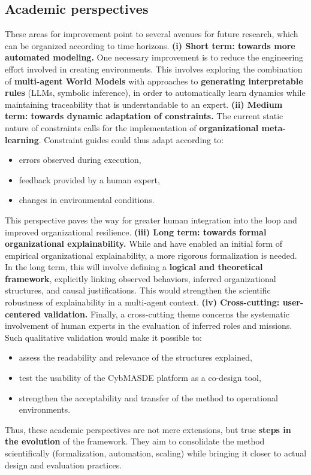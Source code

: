 \subsection*{Academic perspectives}
These areas for improvement point to several avenues for future research, which can be organized according to time horizons.
\medskip
\noindent
\textbf{(i) Short term: towards more automated modeling.}
One necessary improvement is to reduce the engineering effort involved in creating environments.
This involves exploring the combination of \textbf{multi-agent World Models} with approaches to \textbf{generating interpretable rules} (LLMs, symbolic inference), in order to automatically learn dynamics while maintaining traceability that is understandable to an expert.
\medskip
\noindent
\textbf{(ii) Medium term: towards dynamic adaptation of constraints.}
The current static nature of constraints calls for the implementation of \textbf{organizational meta-learning}.
Constraint guides could thus adapt according to:
\begin {itemize}
\item errors observed during execution,
\item feedback provided by a human expert,
\item changes in environmental conditions.
\end{itemize}
This perspective paves the way for greater human integration into the loop and improved organizational resilience.
\medskip
\noindent
\textbf{(iii) Long term: towards formal organizational explainability.}
While  and  have enabled an initial form of empirical organizational explainability, a more rigorous formalization is needed.
In the long term, this will involve defining a \textbf{logical and theoretical framework}, explicitly linking observed behaviors, inferred organizational structures, and causal justifications.
This would strengthen the scientific robustness of explainability in a multi-agent context.
\medskip
\noindent
\textbf{(iv) Cross-cutting: user-centered validation.}
Finally, a cross-cutting theme concerns the systematic involvement of human experts in the evaluation of inferred roles and missions.
Such qualitative validation would make it possible to:
\begin{itemize}
  \item assess the readability and relevance of the structures explained,
  \item test the usability of the CybMASDE platform as a co-design tool,
  \item strengthen the acceptability and transfer of the method to operational environments.
\end{itemize}
\medskip
\noindent
Thus, these academic perspectives are not mere extensions, but true \textbf{steps in the evolution} of the  framework.
They aim to consolidate the method scientifically (formalization, automation, scaling) while bringing it closer to actual  design and evaluation practices.
